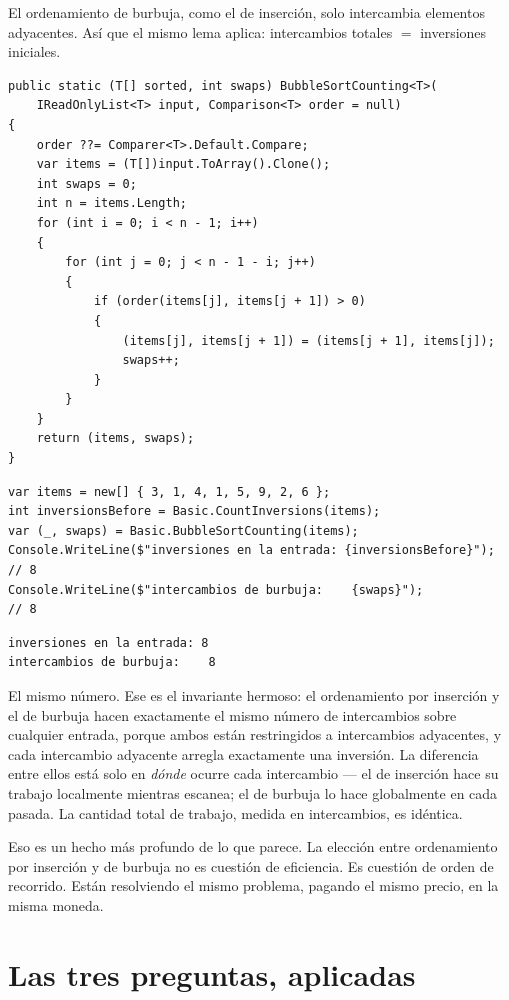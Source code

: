 \documentclass[11pt,a4paper]{article}
\begin{document}
El ordenamiento de burbuja, como el de inserción, solo intercambia elementos adyacentes. Así que el mismo lema aplica: intercambios totales $=$ inversiones iniciales.

\begin{lstlisting}[caption={Ordenamiento de burbuja contando intercambios}]
public static (T[] sorted, int swaps) BubbleSortCounting<T>(
    IReadOnlyList<T> input, Comparison<T> order = null)
{
    order ??= Comparer<T>.Default.Compare;
    var items = (T[])input.ToArray().Clone();
    int swaps = 0;
    int n = items.Length;
    for (int i = 0; i < n - 1; i++)
    {
        for (int j = 0; j < n - 1 - i; j++)
        {
            if (order(items[j], items[j + 1]) > 0)
            {
                (items[j], items[j + 1]) = (items[j + 1], items[j]);
                swaps++;
            }
        }
    }
    return (items, swaps);
}
\end{lstlisting}

\begin{lstlisting}
var items = new[] { 3, 1, 4, 1, 5, 9, 2, 6 };
int inversionsBefore = Basic.CountInversions(items);
var (_, swaps) = Basic.BubbleSortCounting(items);
Console.WriteLine($"inversiones en la entrada: {inversionsBefore}"); // 8
Console.WriteLine($"intercambios de burbuja:    {swaps}");            // 8
\end{lstlisting}

\begin{verbatim}
inversiones en la entrada: 8
intercambios de burbuja:    8
\end{verbatim}

El mismo número. Ese es el invariante hermoso: el ordenamiento por inserción y el de burbuja hacen exactamente el mismo número de intercambios sobre cualquier entrada, porque ambos están restringidos a intercambios adyacentes, y cada intercambio adyacente arregla exactamente una inversión. La diferencia entre ellos está solo en \emph{dónde} ocurre cada intercambio --- el de inserción hace su trabajo localmente mientras escanea; el de burbuja lo hace globalmente en cada pasada. La cantidad total de trabajo, medida en intercambios, es idéntica.

Eso es un hecho más profundo de lo que parece. La elección entre ordenamiento por inserción y de burbuja no es cuestión de eficiencia. Es cuestión de orden de recorrido. Están resolviendo el mismo problema, pagando el mismo precio, en la misma moneda.

\section{Las tres preguntas, aplicadas}
\end{document}
